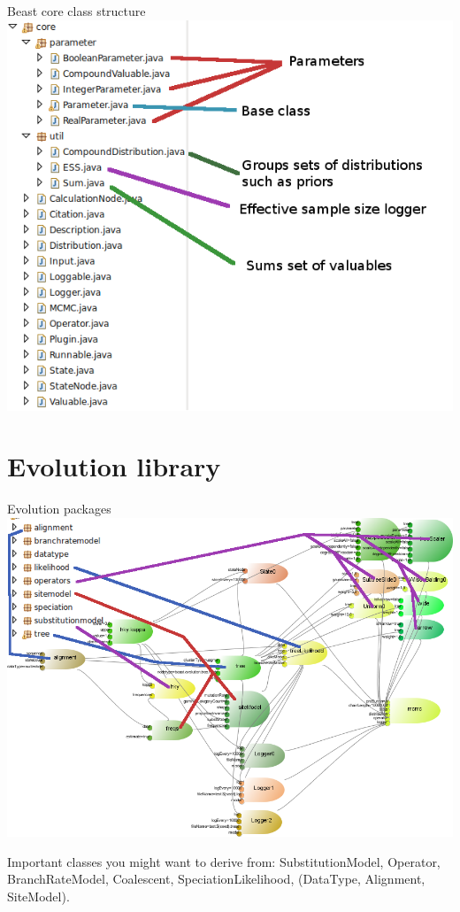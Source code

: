 \documentclass{beamer}
\theoremstyle{definition}
\begin{document}
\begin{frame}{Beast core class structure}
\includegraphics[width=\textwidth]{classes4.png}
\end{frame}


\section{Evolution library}

\begin{frame}[containsverbatim]{Evolution packages}
\includegraphics[width=\textwidth]{classes5b.png}

Important classes you might want to derive from: SubstitutionModel, Operator, 
BranchRateModel, Coalescent, SpeciationLikelihood, (DataType, Alignment,
SiteModel).
\end{frame}
\end{document}
